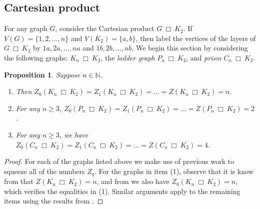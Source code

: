 \documentclass[3p,times,12pt]{article}
\newtheorem{prop}[theorem]{Proposition}
\newcommand{\sqr}{\: \Box\:  }
\begin{document}
	\subsection{Cartesian product}
	For any graph $G$, consider the Cartesian product $G\sqr K_2$. If $V(G) = \{1,2,\ldots,n\}$ and $V(K_2) = \{a,b\}$, then label the vertices of the layers of $G\sqr K_2$ by $1a,2a,\ldots,na$ and $1b,2b,\ldots,nb$.
	We begin this section by considering the following graphs: $K_n \sqr K_2$, the {\em ladder graph} $P_n \sqr K_2$, and {\em prism} $C_n \sqr K_2$.
	\begin{prop} Suppose $n\in \mathbb{N}$.
	\begin{enumerate}
	\item Then $Z_0(K_n \sqr K_2) =  Z_1(K_n \sqr K_2) =\ldots =Z(K_n \sqr K_2) = n$.
	\item For any $n\geq 3$, $Z_0(P_n \sqr K_2) = Z_1(P_n \sqr K_2) = \ldots = Z(P_n \sqr K_2) = 2$.
	\item For any $n\geq 3$, we have $Z_0(C_n \sqr K_2) = Z_1(C_n \sqr K_2) = \ldots = Z(C_n \sqr K_2) = 4$.
	\end{enumerate}
	\end{prop}
	\begin{proof}
	For each of the graphs listed above we make use of previous work to squeeze all of the numbers $Z_q$. For the graphs in item (1), observe that it 
is know from \cite{AIM} that $Z(K_n \sqr K_2)=n$, and from \cite{peters} we also have $Z_0 ( K_n \sqr K_2)=n$, which verifies the equalities in (1). Similar arguments apply to the remaining items using the results from \cite{AIM, peters}.	 
	\end{proof}
\end{document}
